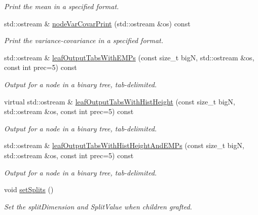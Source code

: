 \begin{DoxyCompactItemize}
\begin{DoxyCompactList}\small\item\em \-Print the mean in a specified format. \end{DoxyCompactList}\item 
std\-::ostream \& \hyperlink{classsubpavings_1_1SPSnode_a03042a5084349960b1fd35396dc509a5}{node\-Var\-Covar\-Print} (std\-::ostream \&os) const 
\begin{DoxyCompactList}\small\item\em \-Print the variance-\/covariance in a specified format. \end{DoxyCompactList}\item 
std\-::ostream \& \hyperlink{classsubpavings_1_1SPSnode_ac273545c33e3abb0114811e7a1b06f98}{leaf\-Output\-Tabs\-With\-E\-M\-Ps} (const size\-\_\-t big\-N, std\-::ostream \&os, const int prec=5) const 
\begin{DoxyCompactList}\small\item\em \-Output for a node in a binary tree, tab-\/delimited. \end{DoxyCompactList}\item 
virtual std\-::ostream \& \hyperlink{classsubpavings_1_1SPSnode_aaf9ac8d98bda6e99c74b946d85c6bc61}{leaf\-Output\-Tabs\-With\-Hist\-Height} (const size\-\_\-t big\-N, std\-::ostream \&os, const int prec=5) const 
\begin{DoxyCompactList}\small\item\em \-Output for a node in a binary tree, tab-\/delimited. \end{DoxyCompactList}\item 
std\-::ostream \& \hyperlink{classsubpavings_1_1SPSnode_ad64bd4af47589b21d9c8dde5135c3d0a}{leaf\-Output\-Tabs\-With\-Hist\-Height\-And\-E\-M\-Ps} (const size\-\_\-t big\-N, std\-::ostream \&os, const int prec=5) const 
\begin{DoxyCompactList}\small\item\em \-Output for a node in a binary tree, tab-\/delimited. \end{DoxyCompactList}\item 
void \hyperlink{classsubpavings_1_1SPSnode_a785e03fc466a6a1ea851f08338f8103d}{set\-Splits} ()
\begin{DoxyCompactList}\small\item\em \-Set the split\-Dimension and \-Split\-Value when children grafted. \end{DoxyCompactList}\end{DoxyCompactItemize}
